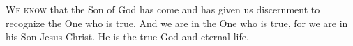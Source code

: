 
\lettrine{W}{e know} that the Son of God has come and has given
us discernment to recognize the One who is true. And we are in
the One who is true, for we are in his Son Jesus Christ. He is
the true God and eternal life.
